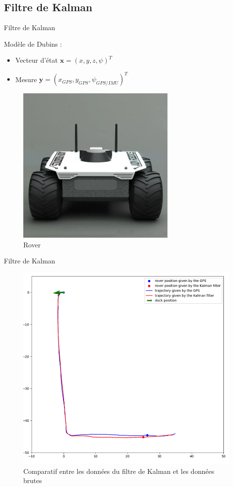 \documentclass[pdftex,beamer,aspectratio=169]{beamer}
\theoremstyle{definition}
\theoremstyle{example}
\theoremstyle{plain}
\begin{document}
\subsection{Filtre de Kalman}
\begin{frame}[fragile]{Filtre de Kalman}
  \begin{minipage}{0.5\textwidth}
    Modèle de Dubins : 
    \begin{itemize}
      \item Vecteur d'état $\textbf{x}=(x, y, z, \psi)^T$
      \item Mesure $\textbf{y}=(x_{GPS}, y_{GPS}, \psi_{GPS/IMU})^T$
    \end{itemize}
  \end{minipage}
  \begin{minipage}{0.49\textwidth}
    \begin{figure}[H]
      \centering
      \includegraphics[width=0.7\textwidth]{rover.jpg}
      \caption{Rover}
    \end{figure}
  \end{minipage}
\end{frame}

\begin{frame}[fragile]{Filtre de Kalman}
    \begin{figure}
      \centering
      \includegraphics[width=.42\textwidth]{GPSvsKalman.png}
      \caption{Comparatif entre les données du filtre de Kalman et les données brutes}
      \label{fig:KalmanvsGPS}
    \end{figure}
\end{frame}
\end{document}
